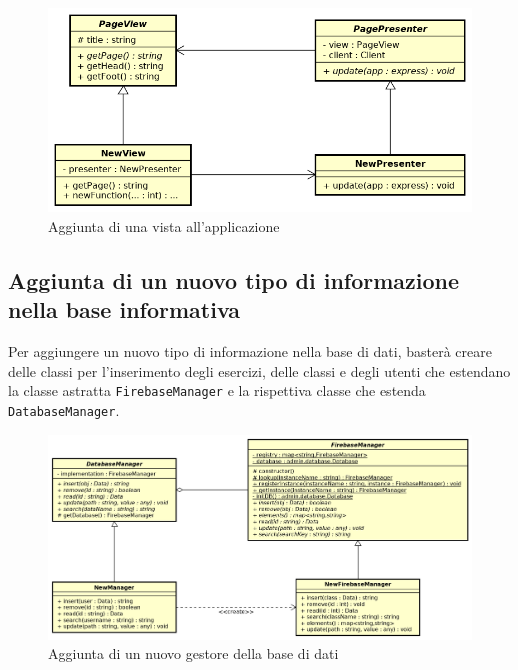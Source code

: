 \begin{figure}[ht]
	\includegraphics[scale=0.75]{images/newview.png}
	\caption{Aggiunta di una vista all'applicazione}
\end{figure}
\newpage

\subsection{Aggiunta di un nuovo tipo di informazione nella base informativa}
Per aggiungere un nuovo tipo di informazione nella base di dati, basterà creare delle classi per l'inserimento degli esercizi, delle classi e degli utenti che estendano la classe astratta \texttt{FirebaseManager} e la rispettiva classe che estenda \texttt{DatabaseManager}.\\
\vspace*{3em}

\begin{figure}[ht]
	\centering
	\includegraphics[scale=0.5]{images/newfirebasemanager.png}
	\caption{Aggiunta di un nuovo gestore della base di dati}
\end{figure}
